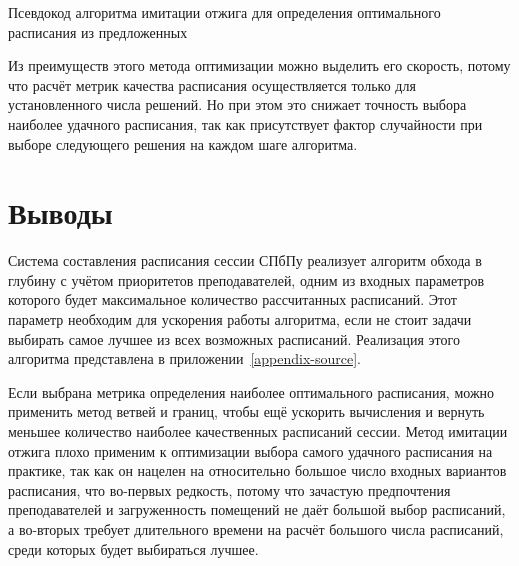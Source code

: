 \begin{algorithm} 
	\nonl{}
	\caption{Псевдокод алгоритма имитации отжига для определения оптимального расписания из предложенных}\label{alg:algoSA}
\end{algorithm} 

Из преимуществ этого метода оптимизации можно выделить его скорость, потому что расчёт метрик качества расписания осуществляется только для установленного числа решений. Но при этом это снижает точность выбора наиболее удачного расписания, так как присутствует фактор случайности при выборе следующего решения на каждом шаге алгоритма.
\FloatBarrier
\section{Выводы} \label{ch2:conclusion}

Система составления расписания сессии СПбПу реализует алгоритм обхода в глубину с учётом приоритетов преподавателей, одним из входных параметров которого будет максимальное количество рассчитанных расписаний. Этот параметр необходим для ускорения работы алгоритма, если не стоит задачи выбирать самое лучшее из всех возможных расписаний. Реализация этого алгоритма представлена в приложении~\ref{appendix-source}.

Если выбрана метрика определения наиболее оптимального расписания, можно применить метод ветвей и границ, чтобы ещё ускорить вычисления и вернуть меньшее количество наиболее качественных расписаний сессии. Метод имитации отжига плохо применим к оптимизации выбора самого удачного расписания на практике, так как он нацелен на относительно большое число входных вариантов расписания, что во-первых редкость, потому что зачастую предпочтения преподавателей и загруженность помещений не даёт большой выбор расписаний, а во-вторых требует длительного времени на расчёт большого числа расписаний, среди которых будет выбираться лучшее.
